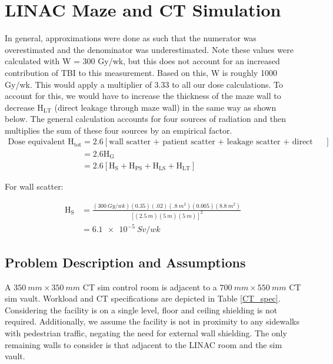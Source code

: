 \documentclass[%
aps,
mph,%
amsmath,amssymb,
preprint,%
tightenlines,
longbibliography,
superscriptaddress,
floatfix,
nofootinbib,
]{revtex4-2}
\begin{document}
\section{LINAC Maze and CT Simulation}
    In general, approximations were done as such that the numerator was overestimated and the denominator was underestimated. Note these values were calculated with W = 300 Gy/wk, but this does not account for an increased contribution of TBI to this measurement. Based on this, W is roughly 1000 Gy/wk. This would apply a multiplier of 3.33 to all our dose calculations. To account for this, we would have to increase the thickness of the maze wall to decrease $\mathrm{H_{LT}}$ (direct leakage through maze wall) in the same way as shown below. The general calculation accounts for four sources of radiation and then multiplies the sum of these four sources by an empirical factor.
    \begin{align*}
        \text{Dose equivalent } \mathrm{H_{tot}} &=  2.6\left[\text{wall scatter + patient scatter + leakage scatter + direct leakage} \right]\\
        &= 2.6 \mathrm{H_G} \\
        &= 2.6 \left[\mathrm{H_S + H_{PS} + H_{LS} + H_{LT}} \right]
    \end{align*}

    For wall scatter:
    
    \begin{align*}
        \mathrm{H_S} &= \frac{(\SI{300}{Gy/wk})(0.35)(.02)(\qty{.8}{m^2})(0.005)(\qty{8.8}{m^2})}{\left[(\qty{2.5}{m})(\qty{5}{m})(\qty{5}{m})\right]^2} \\
         &= \SI{6.1e-5}{Sv/wk}
    \end{align*}

    
    \subsection{Problem Description and Assumptions}
        A $\SI{350}{mm} \times \SI{350}{mm}$ CT sim control room is adjacent to a $\SI{700}{mm} \times \SI{550}{mm}$ CT sim vault. Workload and CT specifications are depicted in Table \ref{CT_spec}. Considering the facility is on a single level, floor and ceiling shielding is not required. Additionally, we assume the facility is not in proximity to any sidewalks with pedestrian traffic, negating the need for external wall shielding. The only remaining walls to consider is that adjacent to the LINAC room and the sim vault.
        
\end{document}
